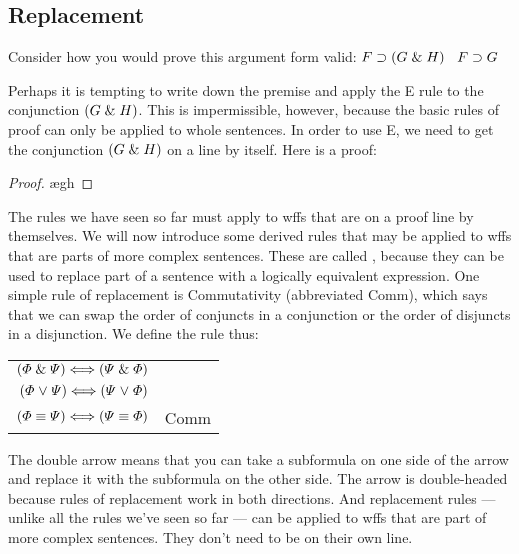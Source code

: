 
\subsection{Replacement}

Consider how you would prove this argument form valid: $F\supset(G\mathrel\& H)$ \therefore\ $F\supset G$

Perhaps it is tempting to write down the premise and apply the {\eand}E rule to the conjunction $(G \mathrel\& H)$. This is impermissible, however, because the basic rules of proof can only be applied to whole sentences. In order to use {\eand}E, we need to get the conjunction $(G \mathrel\& H)$ on a line by itself. Here is a proof:

\begin{proof}
	 \pr{}
	\open
		\ae{gh}
	\close
\end{proof}

The rules we have seen so far must apply to wffs that are on a proof line by themselves. We will now introduce some derived rules that may be applied to wffs that are parts of more complex sentences. These are called , because they can be used to replace part of a sentence with a logically equivalent expression. One simple rule of replacement is Commutativity (abbreviated Comm), which says that we can swap the order of conjuncts in a conjunction or the order of disjuncts in a disjunction. We define the rule thus:

\begin{center}
\begin{tabular}{rl}
$(\varPhi{}\mathrel\&\varPsi{}) \Longleftrightarrow (\varPsi{}\mathrel\&\varPhi{})$\\
$(\varPhi{}\mkern1mu\vee\mkern1mu\varPsi{}) \Longleftrightarrow (\varPsi{}\mkern1mu\vee\mkern1mu\varPhi{})$\\
$(\varPhi{}\equiv\varPsi{}) \Longleftrightarrow (\varPsi{}\equiv\varPhi{})$
& Comm
\end{tabular}
\end{center}

The double arrow means that you can take a subformula on one side of the arrow and replace it with the subformula on the other side. The arrow is double-headed because rules of replacement work in both directions. And replacement rules --- unlike all the rules we've seen so far --- can be applied to wffs that are part of more complex sentences. They don't need to be on their own line.


